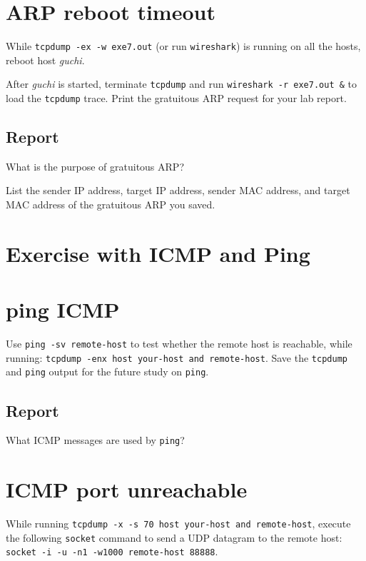 \documentclass{../UTNetLab}
\begin{document}
\section{ARP reboot timeout}
    While \lstinline{tcpdump -ex -w exe7.out} (or run \lstinline{wireshark}) is running on all the hosts, reboot host \textit{guchi}. 

    After \textit{guchi} is started, terminate \lstinline{tcpdump} and run \lstinline{wireshark -r exe7.out &} to load the \lstinline{tcpdump} trace.
    Print the gratuitous ARP request for your lab report.
    
    \subsection*{Report}
    What is the purpose of gratuitous ARP?

    List the sender IP address, target IP address, sender MAC address, and target MAC address of the gratuitous ARP you saved.


\section*{Exercise with ICMP and Ping}
\section{ping ICMP}
    Use \lstinline[emph={remote-host}]{ping -sv remote-host} to test whether the remote host is reachable, while running:
    \lstinline[emph={your-host, remote-host}]{tcpdump -enx host your-host and remote-host}.
    Save the \lstinline{tcpdump} and \lstinline{ping} output for the future study on \lstinline{ping}.
    
    \subsection*{Report}
    What ICMP messages are used by \lstinline{ping}?

\section{ICMP port unreachable}
    While running \lstinline[emph={your-host, remote-host}]{tcpdump -x -s 70 host your-host and remote-host}, execute the following \lstinline{socket} command to send a UDP datagram to the remote host:
    \lstinline[emph={your-host, remote-host}]{socket -i -u -n1 -w1000 remote-host 88888}.
\end{document}
